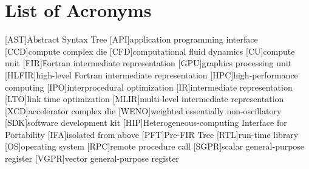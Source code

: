 \section*{List of Acronyms}

\begin{acronym}[paper]
[AST]{Abstract Syntax Tree}
[API]{application programming interface}
[CCD]{compute complex die}
[CFD]{computational fluid dynamics}
[CU]{compute unit}
[FIR]{Fortran intermediate representation}
[GPU]{graphics processing unit}
[HLFIR]{high-level Fortran intermediate representation}
[HPC]{high-performance computing}
[IPO]{interprocedural optimization}
[IR]{intermediate representation}
[LTO]{link time optimization}
[MLIR]{multi-level intermediate representation}
[XCD]{accelerator complex die}
[WENO]{weighted essentially non-oscillatory}
[SDK]{software development kit}
[HIP]{Heterogeneous-computing Interface for Portability}
[IFA]{isolated from above}
[PFT]{Pre-FIR Tree}
[RTL]{run-time library}
[OS]{operating system}
[RPC]{remote procedure call}
[SGPR]{scalar general-purpose register}
[VGPR]{vector general-purpose register}
\end{acronym}